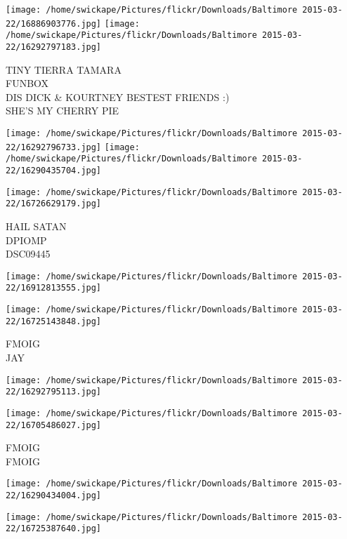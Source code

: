 \documentclass[10pt,letterpaper]{article}
\begin{document}
\texttt{[image: /home/swickape/Pictures/flickr/Downloads/Baltimore 2015-03-22/16886903776.jpg]}
\texttt{[image: /home/swickape/Pictures/flickr/Downloads/Baltimore 2015-03-22/16292797183.jpg]}

TINY TIERRA TAMARA\\
FUNBOX\\
DIS DICK \& KOURTNEY BESTEST FRIENDS :)\\
SHE'S MY CHERRY PIE\\
\pagebreak

\texttt{[image: /home/swickape/Pictures/flickr/Downloads/Baltimore 2015-03-22/16292796733.jpg]}
\texttt{[image: /home/swickape/Pictures/flickr/Downloads/Baltimore 2015-03-22/16290435704.jpg]}

\vspace{0.25in}
\texttt{[image: /home/swickape/Pictures/flickr/Downloads/Baltimore 2015-03-22/16726629179.jpg]}

HAIL SATAN\\
DPIOMP\\
DSC09445\\
\pagebreak

\texttt{[image: /home/swickape/Pictures/flickr/Downloads/Baltimore 2015-03-22/16912813555.jpg]}

\vspace{0.25in}
\texttt{[image: /home/swickape/Pictures/flickr/Downloads/Baltimore 2015-03-22/16725143848.jpg]}

FMOIG\\
JAY\\
\pagebreak

\texttt{[image: /home/swickape/Pictures/flickr/Downloads/Baltimore 2015-03-22/16292795113.jpg]}

\vspace{0.25in}
\texttt{[image: /home/swickape/Pictures/flickr/Downloads/Baltimore 2015-03-22/16705486027.jpg]}

FMOIG\\
FMOIG\\
\pagebreak

\texttt{[image: /home/swickape/Pictures/flickr/Downloads/Baltimore 2015-03-22/16290434004.jpg]}

\vspace{0.25in}
\texttt{[image: /home/swickape/Pictures/flickr/Downloads/Baltimore 2015-03-22/16725387640.jpg]}
\end{document}
